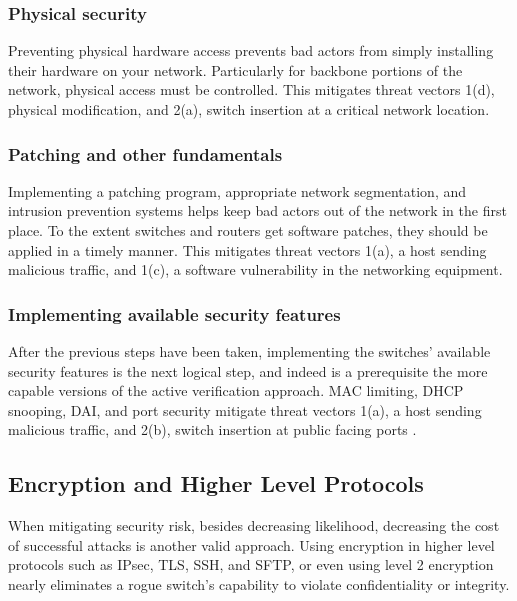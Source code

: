 \documentclass[journal]{IEEEtran}
\begin{document}
\subsubsection{Physical security}
Preventing physical hardware access prevents bad actors from simply installing their hardware on
your network. Particularly for backbone portions of the network, physical access must be controlled.
This mitigates threat vectors 1(d), physical modification, and 2(a), switch insertion at a
critical network location.

\subsubsection{Patching and other fundamentals}
Implementing a patching program, appropriate network segmentation, and intrusion prevention systems
helps keep bad actors out of the network in the first place. To the extent switches and routers get
software patches, they should be applied in a timely manner. This mitigates threat vectors 1(a), a
host sending malicious traffic, and 1(c), a software vulnerability in the networking equipment.

\subsubsection{Implementing available security features}
After the previous steps have been taken, implementing the switches' available security features is
the next logical step, and indeed is a prerequisite the more capable versions of the active
verification approach. MAC limiting, DHCP snooping, DAI, and port security mitigate threat vectors
1(a), a host sending malicious traffic, and 2(b), switch insertion at public facing ports \cite{b1}.


\subsection{Encryption and Higher Level Protocols}
When mitigating security risk, besides decreasing likelihood, decreasing the cost of successful
attacks is another valid approach. Using encryption in higher level protocols such as IPsec, TLS,
SSH, and SFTP, or even using level 2 encryption \cite{b3} nearly eliminates a rogue switch's
capability to violate confidentiality or integrity.
\end{document}
